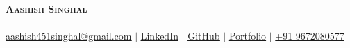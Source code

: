 \begin{center}
    \textbf{\Huge \scshape Aashish Singhal} \\ \vspace{1pt}
    \small \textit{\resumeTitle} \\[3pt]
    \href{mailto:aashish451singhal@gmail.com}{\underline{aashish451singhal@gmail.com}} $|$
    \href{https://www.linkedin.com/in/iamaashish5}{\underline{LinkedIn}} $|$
    \href{https://github.com/AashishSinghal}{\underline{GitHub}} $|$
    \href{https://aashishsinghal.com}{\underline{Portfolio}} $|$
    {\underline{+91 9672080577}}
\end{center}
